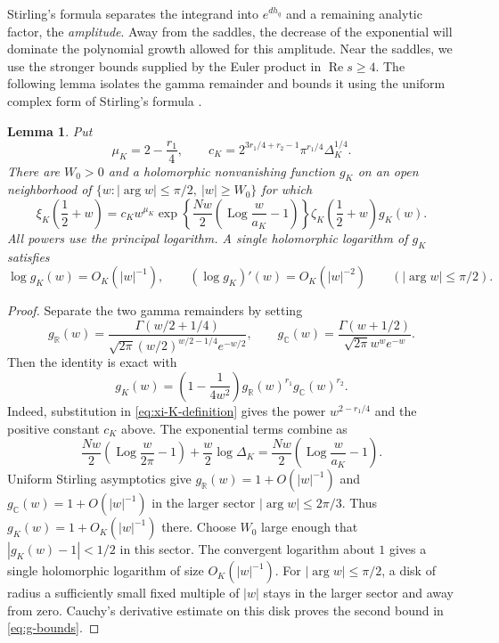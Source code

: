 \documentclass[11pt,reqno]{amsart}
\numberwithin{equation}{section}
\newtheorem{lemma}[theorem]{Lemma}
\DeclareMathOperator{\Log}{Log}
\renewcommand{\Re}{\operatorname{Re}}
\begin{document}
Stirling's formula separates the integrand into $e^{dh_q}$ and a
remaining analytic factor, the \emph{amplitude}. Away from
the saddles, the decrease of the exponential will dominate the
polynomial growth allowed for this amplitude. Near the saddles,
we use the stronger bounds supplied by the Euler product in
$\Re s\ge4$. The following lemma isolates the gamma remainder
and bounds it using the uniform complex form of Stirling's
formula \cite[Section~5.11]{DLMF}.


\begin{lemma}\label{lem:Stirling-amplitude}
Put
\begin{equation}\label{eq:amplitude-constants}
 \mu_K=2-\frac{r_1}{4},\qquad
 c_K=2^{3r_1/4+r_2-1}\pi^{r_1/4}\Delta_K^{1/4}.
\end{equation}
There are $W_0>0$ and a holomorphic nonvanishing function $g_K$
on an open neighborhood of
$\{w:|\arg w|\le\pi/2,\ |w|\ge W_0\}$ for which
\begin{equation}\label{eq:Stirling-identity}
 \xi_K\!\left(\frac12+w\right)
 =c_Kw^{\mu_K}
    \exp\!\left\{\frac{Nw}{2}
                  \left(\Log\frac{w}{a_K}-1\right)\right\}
       \zeta_K\!\left(\frac12+w\right)g_K(w).
\end{equation}
All powers use the principal logarithm. A single holomorphic
logarithm of $g_K$ satisfies
\begin{equation}\label{eq:g-bounds}
 \log g_K(w)=O_K(|w|^{-1}),\qquad
 (\log g_K)'(w)=O_K(|w|^{-2})
 \qquad(|\arg w|\le\pi/2).
\end{equation}
\end{lemma}

\begin{proof}
Separate the two gamma remainders by setting
\[
 g_{\mathbb R}(w)=
 \frac{\Gamma(w/2+1/4)}
 {\sqrt{2\pi}(w/2)^{w/2-1/4}e^{-w/2}},\qquad
 g_{\mathbb C}(w)=
 \frac{\Gamma(w+1/2)}{\sqrt{2\pi}w^we^{-w}}.
\]
Then the identity is exact with
\[
 g_K(w)=\left(1-\frac1{4w^2}\right)
        g_{\mathbb R}(w)^{r_1}g_{\mathbb C}(w)^{r_2}.
\]
Indeed, substitution in \eqref{eq:xi-K-definition} gives the
power $w^{2-r_1/4}$ and the positive constant $c_K$ above.
The exponential terms combine as
\[
 \frac{Nw}{2}\left(\Log\frac{w}{2\pi}-1\right)
       +\frac w2\log\Delta_K
 =\frac{Nw}{2}\left(\Log\frac{w}{a_K}-1\right).
\]
Uniform Stirling asymptotics give
$g_{\mathbb R}(w)=1+O(|w|^{-1})$ and
$g_{\mathbb C}(w)=1+O(|w|^{-1})$ in the larger sector
$|\arg w|\le2\pi/3$. Thus $g_K(w)=1+O_K(|w|^{-1})$ there.
Choose $W_0$ large enough that $|g_K(w)-1|<1/2$ in this sector.
The convergent logarithm about $1$ gives a single holomorphic
logarithm of size $O_K(|w|^{-1})$. For $|\arg w|\le\pi/2$,
a disk of radius a sufficiently small fixed multiple of $|w|$
stays in the larger sector and away from zero. Cauchy's derivative
estimate on this disk proves the second bound in \eqref{eq:g-bounds}.
\end{proof}
\end{document}
